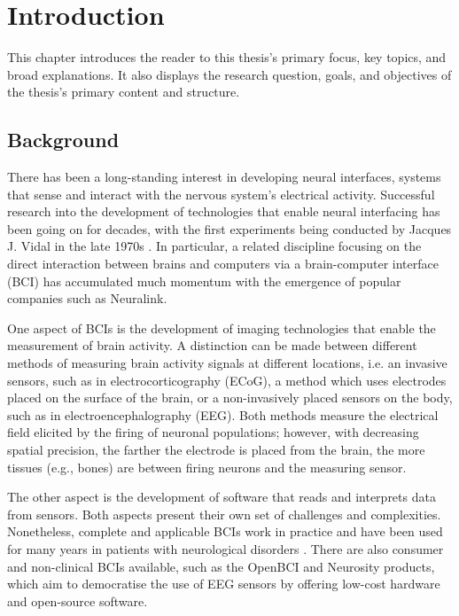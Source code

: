 \chapter{Introduction}
\graphicspath{{Chapter1/Figs/}{Chapter1/Figs/}}

This chapter introduces the reader to this thesis's primary focus, key topics, and broad explanations. It also displays the research question, goals, and objectives of the thesis's primary content and structure.

\section{Background}
\label{chapter1-background}

There has been a long-standing interest in developing neural interfaces, systems that sense and interact with the nervous system's electrical activity. Successful research into the development of technologies that enable neural interfacing has been going on for decades, with the first experiments being conducted by Jacques J. Vidal in the late 1970s \citep{vidal_real-time_1977}. In particular, a related discipline focusing on the direct interaction between brains and computers via a brain-computer interface (BCI) has accumulated much momentum with the emergence of popular companies such as Neuralink.

One aspect of BCIs is the development of imaging technologies that enable the measurement of brain activity. A distinction can be made between different methods of measuring brain activity signals at different locations, i.e. an invasive sensors, such as in electrocorticography (ECoG), a method which uses electrodes placed on the surface of the brain, or a non-invasively placed sensors on the body, such as in electroencephalography (EEG). Both methods measure the electrical field elicited by the firing of neuronal populations; however, with decreasing spatial precision, the farther the electrode is placed from the brain, the more tissues (e.g., bones) are between firing neurons and the measuring sensor.

The other aspect is the development of software that reads and interprets data from sensors. Both aspects present their own set of challenges and complexities. Nonetheless, complete and applicable BCIs work in practice and have been used for many years in patients with neurological disorders \citep{braingate_publications_nodate}. There are also consumer and non-clinical BCIs available, such as the OpenBCI and Neurosity products, which aim to democratise the use of EEG sensors by offering low-cost hardware and open-source software.

